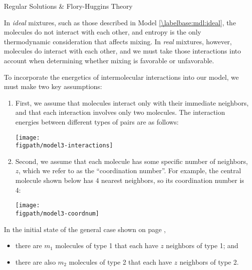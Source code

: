 \begin{activity}{Regular Solutions \& Flory-Huggins Theory}
\begin{ctqs}
\end{ctqs}
	
\clearpage
\begin{model}
\label{\labelbase:mdl:regular}

In \emph{ideal} mixtures, such as those described in Model \ref{\labelbase:mdl:ideal}, the molecules do not interact with each other, and entropy is the only thermodynamic consideration that affects mixing.
In \emph{real} mixtures, however, molecules do interact with each other, and we must take those interactions into account when determining whether mixing is favorable or unfavorable.

To incorporate the energetics of intermolecular interactions into our model, we must make two key assumptions:
\begin{enumerate}
	\item First, we assume that molecules interact only with their immediate neighbors, and that each interaction involves only two molecules.  The interaction energies between different types of pairs are as follows:

\centerline{\texttt{[image: \\figpath/model3-interactions]}}
	
	\item Second, we assume that each molecule has some specific number of neighbors, $z$, which we refer to as the ``coordination number''.  For example, the central molecule shown below has 4 nearest neighbors, so its coordination number is 4:

\centerline{\texttt{[image: \\figpath/model3-coordnum]}}


\end{enumerate}

\end{model}

\begin{ctqs}

	\question In the initial state of the general case shown on page \pageref{\labelbase:eqn:idealS}, 
		\begin{itemize}[itemsep=0pt,topsep=3pt]
			\item there are $m_1$ molecules of type 1 that each have $z$ neighbors of type 1; and
			\item there are also $m_2$ molecules of type 2 that each have $z$ neighbors of type 2.
		\end{itemize}
		

\end{ctqs}
\end{activity}
